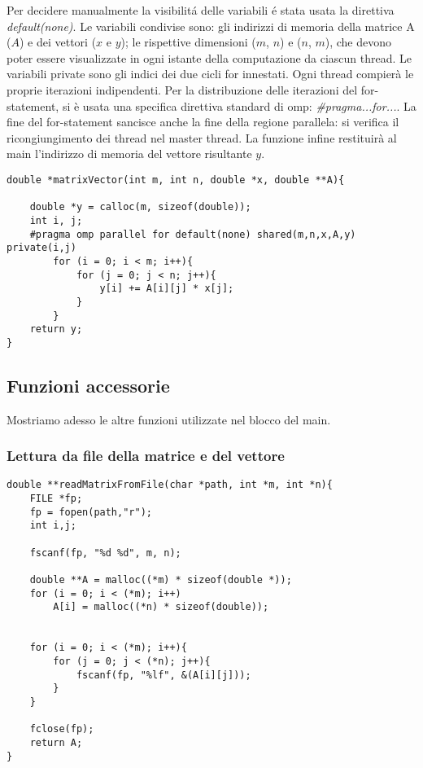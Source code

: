 Per decidere manualmente la visibilitá delle variabili é stata usata la direttiva \textit{default(none)}.
Le variabili condivise sono: gli indirizzi di memoria della matrice A ($A$) e dei vettori ($x$ e $y$); le rispettive dimensioni ($m$, $n$) e ($n$, $m$), che devono poter essere visualizzate in ogni istante della computazione da ciascun thread.
Le variabili private sono gli indici dei due cicli for innestati. Ogni thread compierà le proprie iterazioni indipendenti.
Per la distribuzione delle iterazioni del for-statement, si è usata una specifica direttiva  standard di omp: \textit{\#pragma...for...}. 
La fine del for-statement sancisce anche la fine della regione parallela: si verifica il ricongiungimento dei thread nel master thread.
La funzione infine restituirà al main l'indirizzo di memoria del vettore risultante $y$.
\begin{lstlisting}
double *matrixVector(int m, int n, double *x, double **A){
    
    double *y = calloc(m, sizeof(double));
    int i, j;
    #pragma omp parallel for default(none) shared(m,n,x,A,y) private(i,j)
        for (i = 0; i < m; i++){
            for (j = 0; j < n; j++){
                y[i] += A[i][j] * x[j];
            }
        }
    return y;
}
\end{lstlisting}

\subsection{Funzioni accessorie}
Mostriamo adesso le altre funzioni utilizzate nel blocco del main.
\subsubsection{Lettura da file della matrice e del vettore}
\begin{lstlisting}
double **readMatrixFromFile(char *path, int *m, int *n){
    FILE *fp;
    fp = fopen(path,"r");
    int i,j;

    fscanf(fp, "%d %d", m, n);

    double **A = malloc((*m) * sizeof(double *));
    for (i = 0; i < (*m); i++)
        A[i] = malloc((*n) * sizeof(double));

    
    for (i = 0; i < (*m); i++){
        for (j = 0; j < (*n); j++){
            fscanf(fp, "%lf", &(A[i][j]));
        }
    }

    fclose(fp);
    return A;
}
\end{lstlisting}

